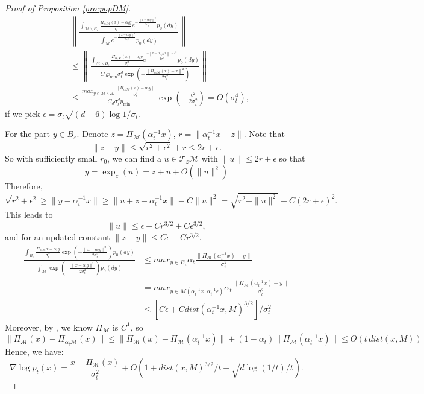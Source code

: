 \documentclass{article}
\def\calM{\mathcal{M}}
\begin{document}
\begin{proof}[Proof of Proposition \ref{pro:popDM}]
\begin{align*}
& \left\|\frac{\int_{\calM \backslash B_{\varepsilon}}\frac{\Pi_{\alpha_t\mathcal{M}}(x)-\alpha_t y}{\sigma_t^2} e^{-\frac{\left\|x-\alpha_t y\right\|^2}{2\sigma_t^2}} p_0(dy)}{\int_{\calM} e^{-\frac{\left\|x-\alpha_t y\right\|^2}{2\sigma_t^2}} p_0(dy)}\right\|\\
&\leq 
\left\|\frac{\int_{\calM \backslash B_{\varepsilon}}\frac{\Pi_{\alpha_t\mathcal{M}}(x)-\alpha_t y}{\sigma_t^2} e^{\frac{-\left\|x-\Pi_{\alpha_t\calM} x\right\|^2-\epsilon^2}{2\sigma_t^2}} p_0(dy)}{ C_d   
p_{\min}\sigma_t^{d}\exp(-\frac{\left\|\Pi_{\alpha_t\mathcal{M}}(x)-x\right\|^2}{2\sigma_t^2})}\right\| \\
&\leq \frac{max_{y\in \calM \backslash B_\epsilon} \frac{\|\Pi_{\alpha_t\calM}(x)-\alpha_t y\|}{\sigma^2_t}}{C_d\sigma_t^{d} p_{\min}}\exp(-\frac{\epsilon^2}{2\sigma_t^2}) = O(\sigma_t^{4}),
\end{align*}
if we pick $\epsilon=\sigma_t \sqrt{(d+6)\log 1/\sigma_t }.$  

For the part $y\in B_{\varepsilon}$. Denote $z=\Pi_{\calM} (\alpha_t^{-1}x)$, $r=\|\alpha_t^{-1}x-z\|$. Note that 
\[
\|z-y\|\leq \sqrt{r^2+\epsilon^2}+r\leq 2r+\epsilon. 
\]
So with sufficiently small $r_0$, we can find a $u\in \mathcal{T}_z\calM$ with $\|u\|\leq 2r+\epsilon$ so that 
\[
y=\exp_z(u)=z+u+O(\|u\|^2)
\]
Therefore, 
\[
\sqrt{r^2+\epsilon^2}\geq \|y-\alpha_t^{-1}x\|\geq \|u+z-\alpha_t^{-1}x\|-C\|u\|^2=\sqrt{r^2+\|u\|^2}-C(2r+\epsilon)^2.
\]
This leads to 
\[
\|u\|\leq \epsilon+C r^{3/2}+C\epsilon^{3/2},
\]
and for an updated constant $\|z-y\|\leq C\epsilon+Cr^{3/2}$.
\[ 
\begin{aligned}
\frac{\int_{B_{\varepsilon}} \frac{\Pi_{\alpha_t\calM}{x} - \alpha_t y}{\sigma_t^2} \exp\left( -\frac{\|x - \alpha_t y\|^2}{2 \sigma_t^2} \right) p_0(dy)}{\int_{\calM} \exp\left( -\frac{\|x - \alpha_t y\|^2}{2 \sigma_t^2} \right) p_0(dy)}
&\leq max_{y\in B_\epsilon} \alpha_t\frac{\|\Pi_{\calM}(\alpha_t^{-1}x)-y\|}{\sigma^2_t}\\
&=max_{y\in M(\alpha_t^{-1}x, \alpha_t^{-1}\epsilon)} \alpha_t\frac{\|\Pi_{\calM}(\alpha_t^{-1}x)-y\|}{\sigma^2_t}\\
&\leq [C\epsilon+Cdist(\alpha_t^{-1}x,M)^{3/2}]/\sigma^2_t 
\end{aligned}
\]
Moreover, by \cite{leobacher2021existence}, we know $\Pi_{\calM}$ is $C^1$, so  
\[
\|\Pi_{\calM}(x)-\Pi_{\alpha_t\calM}(x)\|
\leq \|\Pi_{\calM}(x)-\Pi_{\calM}(\alpha_t^{-1}x)\|+
(1-\alpha_t)\|\Pi_{\calM}(\alpha_t^{-1}x)\|
\leq O(t\, dist(x,M))
\]
Hence, we have:
\[
\nabla \log p_t(x) =
\frac{x-\Pi_{\calM}(x)}{\sigma_t^2}+
O(1+dist(x,M)^{3/2}/t+\sqrt{d\log (1/t)/t}). 
\]



\end{proof}
\end{document}
